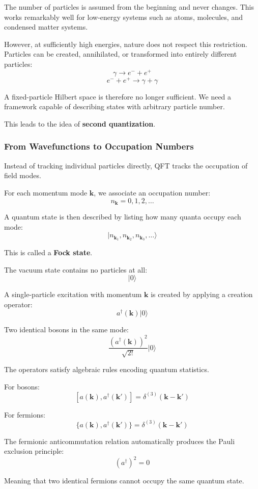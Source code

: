 The number of particles is assumed from the beginning and never changes.
This works remarkably well for low-energy systems such as atoms, molecules, and condensed matter systems.

However, at sufficiently high energies, nature does not respect this restriction.
Particles can be created, annihilated, or transformed into entirely different particles:
\[
\gamma \rightarrow e^- + e^+
\]
\[
e^- + e^+ \rightarrow \gamma + \gamma
\]

A fixed-particle Hilbert space is therefore no longer sufficient.
We need a framework capable of describing states with arbitrary particle number.

This leads to the idea of \textbf{second quantization}.

\subsubsection*{From Wavefunctions to Occupation Numbers}

Instead of tracking individual particles directly, QFT tracks the occupation of field modes.

For each momentum mode $\mathbf{k}$, we associate an occupation number:
\[
n_{\mathbf{k}} = 0,1,2,\dots
\]

A quantum state is then described by listing how many quanta occupy each mode:
\[
|n_{\mathbf{k}_1}, n_{\mathbf{k}_2}, n_{\mathbf{k}_3}, \dots \rangle
\]

This is called a \textbf{Fock state}.

The vacuum state contains no particles at all:
\[
|0\rangle
\]

A single-particle excitation with momentum $\mathbf{k}$ is created by applying a creation operator:
\[
a^\dagger(\mathbf{k}) |0\rangle
\]

Two identical bosons in the same mode:
\[
\frac{(a^\dagger(\mathbf{k}))^2}{\sqrt{2!}} |0\rangle
\]

The operators satisfy algebraic rules encoding quantum statistics.

For bosons:
\[
[a(\mathbf{k}), a^\dagger(\mathbf{k}')] =
\delta^{(3)}(\mathbf{k}-\mathbf{k}')
\]

For fermions:
\[
\{a(\mathbf{k}), a^\dagger(\mathbf{k}')\} =
\delta^{(3)}(\mathbf{k}-\mathbf{k}')
\]

The fermionic anticommutation relation automatically produces the Pauli exclusion principle:
\[
(a^\dagger)^2 = 0
\]

Meaning that two identical fermions cannot occupy the same quantum state.

